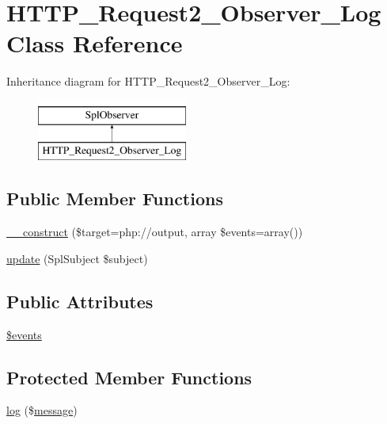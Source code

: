 \hypertarget{classHTTP__Request2__Observer__Log}{}\section{H\+T\+T\+P\+\_\+\+Request2\+\_\+\+Observer\+\_\+\+Log Class Reference}
\label{classHTTP__Request2__Observer__Log}
Inheritance diagram for H\+T\+T\+P\+\_\+\+Request2\+\_\+\+Observer\+\_\+\+Log\+:\begin{figure}[H]
\begin{center}
\leavevmode
\includegraphics[height=2.000000cm]{classHTTP__Request2__Observer__Log}
\end{center}
\end{figure}
\subsection*{Public Member Functions}
\begin{DoxyCompactItemize}
\item 
\hyperlink{classHTTP__Request2__Observer__Log_a7b3154239615e762d5c8a483f82677d3}{\+\_\+\+\_\+construct} (\$target=\textquotesingle{}php\+://output\textquotesingle{}, array \$events=array())
\item 
\hyperlink{classHTTP__Request2__Observer__Log_a3afb07b1a609c2f3c12b9cd5fa267947}{update} (Spl\+Subject \$subject)
\end{DoxyCompactItemize}
\subsection*{Public Attributes}
\begin{DoxyCompactItemize}
\item 
\hyperlink{classHTTP__Request2__Observer__Log_a28a4c14e527f6e34cbd3f0c1fa482e97}{\$events}
\end{DoxyCompactItemize}
\subsection*{Protected Member Functions}
\begin{DoxyCompactItemize}
\item 
\hyperlink{classHTTP__Request2__Observer__Log_a253f36793403dd77277fb2e76d19c117}{log} (\$\hyperlink{classmessage}{message})
\end{DoxyCompactItemize}

